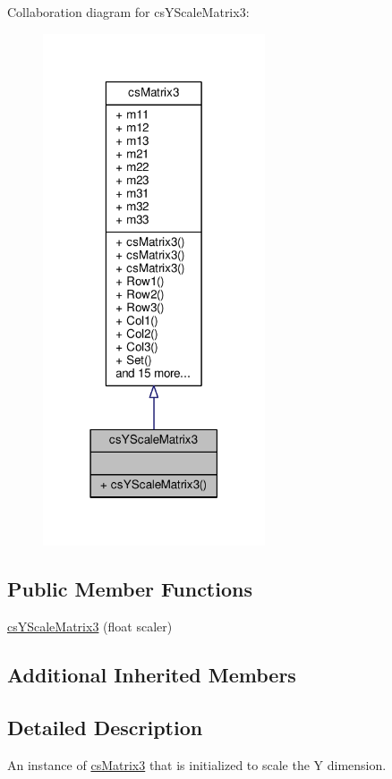 Collaboration diagram for cs\+Y\+Scale\+Matrix3\+:
\nopagebreak
\begin{figure}[H]
\begin{center}
\leavevmode
\includegraphics[width=186pt]{d3/d66/classcsYScaleMatrix3__coll__graph}
\end{center}
\end{figure}
\subsection*{Public Member Functions}
\begin{DoxyCompactItemize}
\item 
\hyperlink{classcsYScaleMatrix3_ae461ae74854241aa270aae22f09428c6}{cs\+Y\+Scale\+Matrix3} (float scaler)
\end{DoxyCompactItemize}
\subsection*{Additional Inherited Members}


\subsection{Detailed Description}
An instance of \hyperlink{classcsMatrix3}{cs\+Matrix3} that is initialized to scale the Y dimension. 


